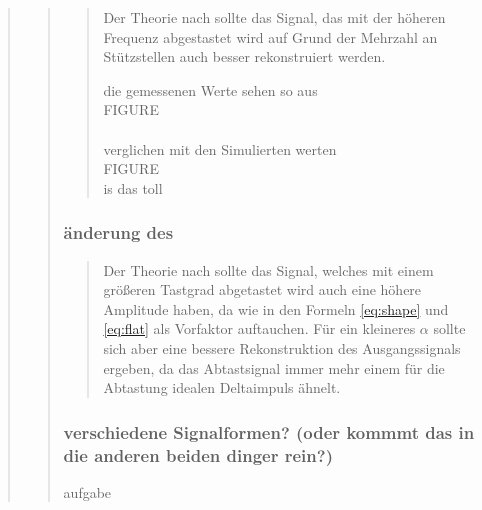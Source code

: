 \begin{quote}
\begin{quote}
\begin{quote}
            Der Theorie nach sollte das Signal, das mit der höheren
            Frequenz abgestastet wird auf Grund der Mehrzahl an Stützstellen
            auch besser rekonstruiert werden.
           
            die gemessenen Werte sehen so aus\\
            
            FIGURE\\
            \\
            
            
            verglichen mit den Simulierten werten\\
            
            FIGURE\\
            
            is das toll\\
        \end{quote}


        \subsubsection{änderung des \alpha }
        \begin{quote}
             
             Der Theorie nach sollte das Signal, welches mit einem größeren
             Tastgrad abgetastet wird auch eine höhere Amplitude haben, da wie
             in den Formeln \ref{eq:shape} und \ref{eq:flat} als Vorfaktor
             auftauchen. Für ein kleineres $\alpha$ sollte sich aber eine
             bessere Rekonstruktion des Ausgangssignals ergeben, da das
             Abtastsignal immer mehr einem für die Abtastung idealen
             Deltaimpuls ähnelt.
        \end{quote}


        \subsubsection{verschiedene Signalformen? (oder kommmt das in die anderen beiden dinger rein?)}
        aufgabe
        \begin{quote}
            
        \end{quote}


        
        
        
    \end{quote}
    
\end{quote}









